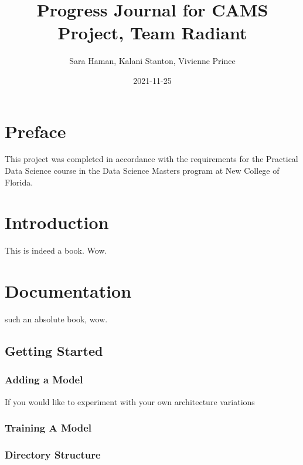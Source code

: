 \documentclass[
]{book}
\title{Progress Journal for CAMS Project, Team Radiant}
\author{Sara Haman, Kalani Stanton, Vivienne Prince}
\date{2021-11-25}
\begin{document}
\maketitle

{
\setcounter{tocdepth}{1}
\tableofcontents
}
\hypertarget{preface}{%
\chapter*{Preface}\label{preface}}

This project was completed in accordance with the requirements for the Practical Data Science course in the Data Science Masters program at New College of Florida.

\hypertarget{intro}{%
\chapter{Introduction}\label{intro}}

This is indeed a book. Wow.

\hypertarget{documentation}{%
\chapter{Documentation}\label{documentation}}

such an absolute book, wow.

\hypertarget{getting-started}{%
\section{Getting Started}\label{getting-started}}

\hypertarget{adding-a-model}{%
\subsection{Adding a Model}\label{adding-a-model}}

If you would like to experiment with your own architecture variations

\hypertarget{training-a-model}{%
\subsection{Training A Model}\label{training-a-model}}

\hypertarget{directory-structure}{%
\subsection{Directory Structure}\label{directory-structure}}
\end{document}
